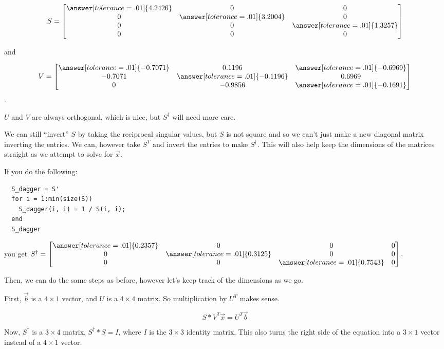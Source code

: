 \documentclass{ximera}
\begin{document}
\begin{example}
\[
S =
\begin{bmatrix}
\answer[tolerance=.01]{4.2426} & 0      & 0 \\
0      & \answer[tolerance=.01]{3.2004} & 0 \\
0      & 0      & \answer[tolerance=.01]{1.3257} \\
0      & 0      & 0
\end{bmatrix}
\]

and

\[
V =
\begin{bmatrix}
\answer[tolerance=.01]{-0.7071} & 0.1196 & \answer[tolerance=.01]{-0.6969} \\
-0.7071 & \answer[tolerance=.01]{-0.1196} & 0.6969 \\
0 & -0.9856 & \answer[tolerance=.01]{-0.1691}
\end{bmatrix}
\].

$U$ and $V$ are always orthogonal, which is nice, but $S^\dagger$ will need more care. 

We can still ``invert'' $S$ by taking the reciprocal singular values, but $S$ is not square and so we can't just make a new diagonal matrix inverting the entries. We can, however take $S^T$ and invert the entries to make $S^\dagger$. This will also help keep the dimensions of the matrices straight as we attempt to solve for $\vec{x}$. 

If you do the following: 

\begin{verbatim}
  S_dagger = S' 
  for i = 1:min(size(S))
    S_dagger(i, i) = 1 / S(i, i);
  end
  S_dagger
\end{verbatim}

you get \( S^\dagger = \begin{bmatrix}
  \answer[tolerance=.01]{0.2357} & 0      & 0      & 0 \\
  0      & \answer[tolerance=.01]{0.3125} & 0      & 0 \\
  0      & 0      & \answer[tolerance=.01]{0.7543} & 0
  \end{bmatrix}. \)

  Then, we can do the same steps as before, however let's keep track of the dimensions as we go. 

  First, $\vec{b}$ is a $4\times 1$ vector, and $U$ is a $4\times4$ matrix. So multiplication by $U^T$ makes sense.

$$S*V^T\vec{x}=U^T\vec{b}$$

Now, $S^\dagger$ is a $3\times 4$ matrix, $S^\dagger*S=I$, where $I$ is the $3\times 3$ identity matrix. This also turns the right side of the equation into a $3\times 1$ vector instead of a $4\times 1$ vector. 


\end{example}
\end{document}
